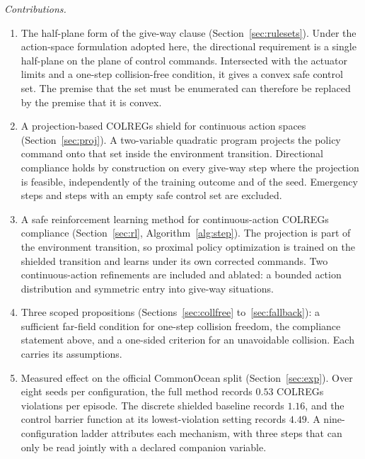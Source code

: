 \documentclass[10pt,letterpaper]{article}
\begin{document}
\noindent\textit{Contributions.}
\begin{enumerate}\itemsep2pt
 \item The half-plane form of the give-way clause (Section~\ref{sec:rulesets}). Under the
action-space formulation adopted here, the directional requirement is a single half-plane
on the plane of control commands. Intersected with the actuator limits and a one-step collision-free condition, it gives a
convex safe control set. The premise that the set must be enumerated can therefore be
replaced by the premise that it is convex.
 \item A projection-based COLREGs shield for continuous action spaces
(Section~\ref{sec:proj}). A two-variable quadratic program projects the policy command
onto that set inside the environment transition. Directional compliance holds by
construction on every give-way step where the projection is feasible, independently of
the training outcome and of the seed. Emergency steps and steps with an empty safe
control set are excluded.
 \item A safe reinforcement learning method for continuous-action COLREGs compliance (Section~\ref{sec:rl}, Algorithm~\ref{alg:step}). The projection is part of the environment transition, so proximal policy optimization is trained on the shielded transition and learns under its own corrected commands. Two continuous-action refinements are included and ablated: a bounded action distribution and symmetric entry into give-way situations.
 \item Three scoped propositions (Sections~\ref{sec:collfree} to~\ref{sec:fallback}):
a sufficient far-field condition for one-step collision freedom, the compliance statement
above, and a one-sided criterion for an unavoidable collision. Each carries its assumptions.
 \item Measured effect on the official CommonOcean split (Section~\ref{sec:exp}).
Over eight seeds per configuration, the full method records $0.53$ COLREGs violations
per episode. The discrete shielded baseline records $1.16$, and the control barrier
function at its lowest-violation setting records $4.49$. A nine-configuration ladder attributes each mechanism, with three steps that can only be
read jointly with a declared companion variable.
\end{enumerate}

\end{document}
